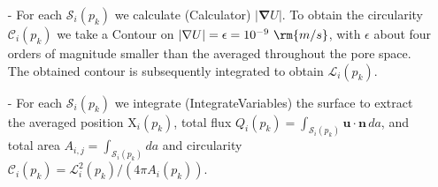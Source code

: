 \documentclass[draft,jgrga]{agutexSI2019}
\begin{document}
\begin{article}
\begin{itemize}
	\item[-] For each $\mathcal{S}_i(p_k)$ we calculate (Calculator) $\left|\mathbf{\nabla}U\right|$. To obtain the circularity $\mathcal{C}_i(p_k)$ we take a Contour on $\left|\mathbf{\nabla}U\right|=\epsilon = 10^{-9}~\rm{m/s}$, with $\epsilon$ about four orders of magnitude smaller than the averaged throughout the pore space. The obtained contour is subsequently integrated to obtain $\mathcal{L}_i(p_k)$.  
	\item[-] For each $\mathcal{S}_i(p_k)$ we integrate (IntegrateVariables) the surface to extract the averaged position $\mathrm{X}_i(p_k)$, total flux $Q_i(p_k) = \int_{\mathcal{S}_i(p_k)}\mathbf{u}\cdot\mathbf{n}\,da$, and total area $A_{i,j}= \int_{\mathcal{S}_i(p_k)}da$ and circularity $\mathcal{C}_i(p_k) = \mathcal{L}^2_i(p_k)/(4\pi A_i(p_k))$. 
\end{itemize}




\end{article}
\end{document}

